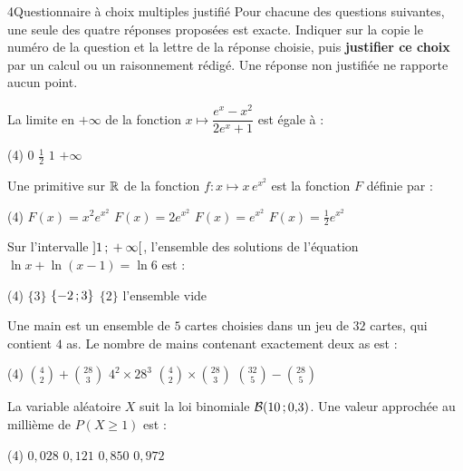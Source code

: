 

\begin{exoBac}{4}{Questionnaire à choix multiples justifié}
Pour chacune des questions suivantes, une seule des quatre réponses proposées est exacte. Indiquer sur la copie le numéro de la
question et la lettre de la réponse choisie, puis \textbf{justifier ce choix} par un calcul ou un raisonnement rédigé. Une réponse
non justifiée ne rapporte aucun point.
\begin{questions}
  \item La limite en $+\infty$ de la fonction $x\mapsto\dfrac{e^{x}-x^{2}}{2e^{x}+1}$ est égale à :
\begin{tasks}[label=\alph*)](4)
  \task $0$
  \task $\frac12$
  \task $1$
  \task $+\infty$
\end{tasks}
  \item Une primitive sur $\mathbb{R}$ de la fonction $f:x\mapsto x\,e^{x^{2}}$ est la fonction $F$ définie par :
\begin{tasks}[label=\alph*)](4)
  \task $F(x)=x^{2}e^{x^{2}}$
  \task $F(x)=2e^{x^{2}}$
  \task $F(x)=e^{x^{2}}$
  \task $F(x)=\frac12e^{x^{2}}$
\end{tasks}
  \item Sur l'intervalle $\mathopen{]}1\,{;}\,+\infty\mathclose{[}$, l'ensemble des solutions de l'équation $\ln x+\ln(x-1)=\ln6$ est :
\begin{tasks}[label=\alph*)](4)
  \task $\{3\}$
  \task $\{-2\,{;}\,3\}$
  \task $\{2\}$
  \task l'ensemble vide
\end{tasks}
  \item Une main est un ensemble de $5$ cartes choisies dans un jeu de $32$ cartes, qui contient $4$ as. Le nombre de mains contenant
    exactement deux as est :
\begin{tasks}[label=\alph*)](4)
  \task $\binom42+\binom{28}{3}$
  \task $4^{2}\times28^{3}$
  \task $\binom42\times\binom{28}{3}$
  \task $\binom{32}{5}-\binom{28}{5}$
\end{tasks}
  \item La variable aléatoire $X$ suit la loi binomiale $\mathcal{B}(10\,{;}\,0{,}3)$. Une valeur approchée au millième de $P(X\geq1)$ est :
\begin{tasks}[label=\alph*)](4)
  \task $0{,}028$
  \task $0{,}121$
  \task $0{,}850$
  \task $0{,}972$
\end{tasks}
\end{questions}
\end{exoBac}


